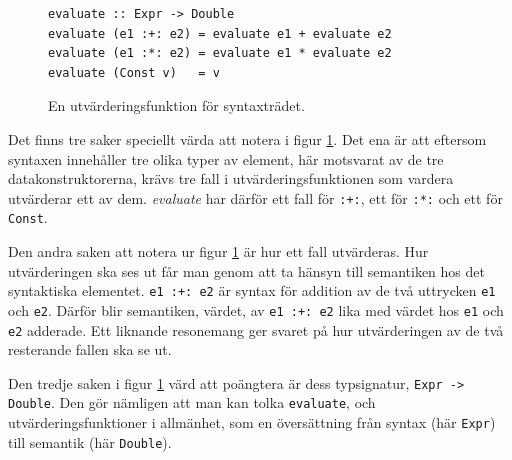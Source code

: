\begin{draft}
\begin{figure}[tph]
  \begin{lstlisting}
evaluate :: Expr -> Double
evaluate (e1 :+: e2) = evaluate e1 + evaluate e2
evaluate (e1 :*: e2) = evaluate e1 * evaluate e2
evaluate (Const v)   = v
  \end{lstlisting}
  \caption{En utvärderingsfunktion för syntaxträdet.}
  \label{fig:eval_tree}
\end{figure}

Det finns tre saker speciellt värda att notera i figur \ref{fig:eval_tree}. Det ena är att eftersom syntaxen innehåller tre olika typer av element, här motsvarat av de tre datakonstruktorerna, krävs tre fall i utvärderingsfunktionen som vardera utvärderar ett av dem. \textit{evaluate} har därför ett fall för \texttt{:+:}, ett för \texttt{:*:} och ett för \texttt{Const}. 

Den andra saken att notera ur figur \ref{fig:eval_tree} är hur ett fall utvärderas. Hur utvärderingen ska ses ut får man genom att ta hänsyn till semantiken hos det syntaktiska elementet. \texttt{e1 :+: e2} är syntax för addition av de två uttrycken \texttt{e1} och \texttt{e2}. Därför blir semantiken, värdet, av \texttt{e1 :+: e2} lika med värdet hos \texttt{e1} och \texttt{e2} adderade. Ett liknande resonemang ger svaret på hur utvärderingen av de två resterande fallen ska se ut.

Den tredje saken i figur \ref{fig:eval_tree} värd att poängtera är dess typsignatur, \texttt{Expr -> Double}. Den gör nämligen att man kan tolka \texttt{evaluate}, och utvärderingsfunktioner i allmänhet, som en översättning från syntax (här \texttt{Expr}) till semantik (här \texttt{Double}).

\end{draft}

